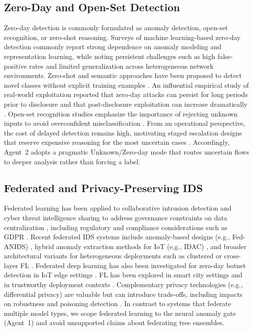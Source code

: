 \documentclass[conference]{IEEEtran}
\begin{document}
\subsection{Zero-Day and Open-Set Detection}
Zero-day detection is commonly formulated as anomaly detection, open-set recognition, or zero-shot reasoning. Surveys of machine learning-based zero-day detection commonly report strong dependence on anomaly modeling and representation learning, while noting persistent challenges such as high false-positive rates and limited generalization across heterogeneous network environments. Zero-shot and semantic approaches have been proposed to detect novel classes without explicit training examples \cite{ZeroShot}. An influential empirical study of real-world exploitation reported that zero-day attacks can persist for long periods prior to disclosure and that post-disclosure exploitation can increase dramatically \cite{Bilge2012Zeroday}. Open-set recognition studies emphasize the importance of rejecting unknown inputs to avoid overconfident misclassification \cite{Scheirer2013OpenSet,Bendale2016OpenMax}. From an operational perspective, the cost of delayed detection remains high, motivating staged escalation designs that reserve expensive reasoning for the most uncertain cases \cite{IBMDB2024}. Accordingly, Agent~2 adopts a pragmatic Unknown/Zero-day mode that routes uncertain flows to deeper analysis rather than forcing a label.

\subsection{Federated and Privacy-Preserving IDS}
Federated learning has been applied to collaborative intrusion detection and cyber threat intelligence sharing to address governance constraints on data centralization \cite{MSarhan}, including regulatory and compliance considerations such as GDPR \cite{GDPR2016}. Recent federated IDS systems include anomaly-based designs (e.g., Fed-ANIDS) \cite{ANIDS}, hybrid anomaly extraction methods for IoT (e.g., IDAC) \cite{IDAC}, and broader architectural variants for heterogeneous deployments such as clustered or cross-layer FL \cite{Clustered,Cross}. Federated deep learning has also been investigated for zero-day botnet detection in IoT edge settings \cite{Meftah2022FederatedBotnet}. FL has been explored in smart city settings \cite{Smartcity} and in trustworthy deployment contexts \cite{Trustworthy}. Complementary privacy technologies (e.g., differential privacy) are valuable but can introduce trade-offs, including impacts on robustness and poisoning detection \cite{CanDiff}. In contrast to systems that federate multiple model types, we scope federated learning to the neural anomaly gate (Agent~1) and avoid unsupported claims about federating tree ensembles.
\end{document}
